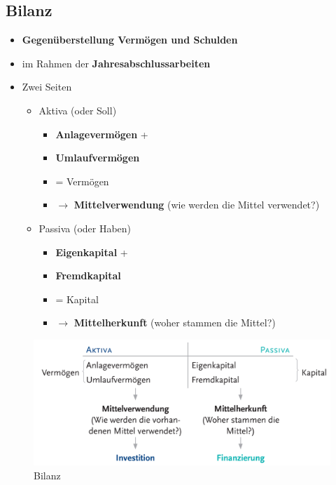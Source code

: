 \documentclass[a4paper, ngerman]{article}
\begin{document}
\subsection{Bilanz}
\begin{itemize}
    \item \textbf{Gegenüberstellung Vermögen und Schulden}
    \item im Rahmen der \textbf{Jahresabschlussarbeiten}
    \item Zwei Seiten
          \begin{itemize}
              \item Aktiva (oder Soll)
                    \begin{itemize}
                        \item \textbf{Anlagevermögen} +
                        \item \textbf{Umlaufvermögen}
                        \item = Vermögen
                        \item $\rightarrow$ \textbf{Mittelverwendung} (wie werden die Mittel verwendet?)
                    \end{itemize}
              \item Passiva (oder Haben)
                    \begin{itemize}
                        \item \textbf{Eigenkapital} +
                        \item \textbf{Fremdkapital}
                        \item = Kapital
                        \item $\rightarrow$ \textbf{Mittelherkunft} (woher stammen die Mittel?)
                    \end{itemize}
          \end{itemize}
\end{itemize}
\begin{figure}[h]
    \centering
    \includegraphics[scale=0.3]{pics/bilanz.png}
    \caption{Bilanz}
\end{figure}
\end{document}
